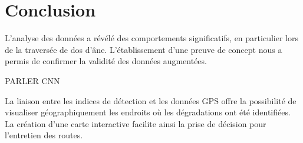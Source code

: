 \section{Conclusion}

L'analyse des données a révélé des comportements significatifs, en particulier lors de la traversée de dos d'âne. L'établissement d'une preuve de concept nous a permis de confirmer la validité des données augmentées.
 
PARLER CNN

La liaison entre les indices de détection et les données GPS offre la possibilité de visualiser géographiquement les endroits où les dégradations ont été identifiées. La création d'une carte interactive facilite ainsi la prise de décision pour l'entretien des routes.